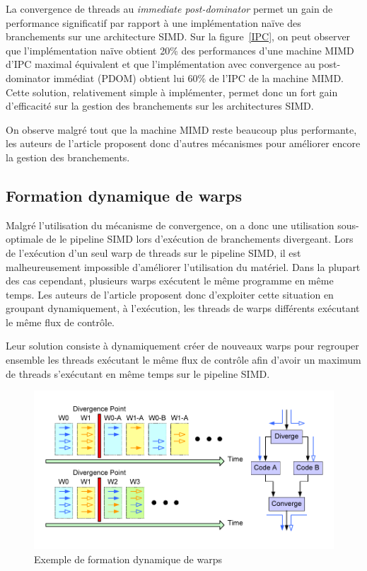 \documentclass[11pt]{article}
\begin{document}
La convergence de threads au \emph{immediate post-dominator} permet un gain de performance significatif par rapport à une implémentation naïve des branchements sur une architecture SIMD.
Sur la figure~\ref{IPC}, on peut observer que l'implémentation naïve obtient 20\% des performances d'une machine MIMD d'IPC maximal équivalent et que l'implémentation avec convergence au post-dominator immédiat (PDOM) obtient lui 60\% de l'IPC de la machine MIMD.
Cette solution, relativement simple à implémenter, permet donc un fort gain d'efficacité sur la gestion des branchements sur les architectures SIMD.

On observe malgré tout que la machine MIMD reste beaucoup plus performante, les auteurs de l'article proposent donc d'autres mécanismes pour améliorer encore la gestion des branchements.

\subsection{Formation dynamique de warps}

Malgré l'utilisation du mécanisme de convergence, on a donc une utilisation sous-optimale de le pipeline SIMD lors d'exécution de branchements divergeant. Lors de l'exécution d'un seul warp de threads sur le pipeline SIMD, il est malheureusement impossible d'améliorer l'utilisation du matériel.
Dans la plupart des cas cependant, plusieurs warps exécutent le même programme en même temps.
Les auteurs de l'article proposent donc d'exploiter cette situation en groupant dynamiquement, à l'exécution, les threads de warps différents exécutant le même flux de contrôle.

Leur solution consiste à dynamiquement créer de nouveaux warps pour regrouper ensemble les threads exécutant le même flux de contrôle afin d'avoir un maximum de threads s'exécutant en même temps sur le pipeline SIMD.

\begin{figure}[h]
   \caption{\label{FUSION} Exemple de formation dynamique de warps}
   \includegraphics[scale=.5]{fusion}
\end{figure}
\end{document}

